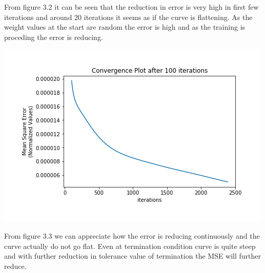 From figure 3.2 it can be seen that the reduction in error is very high in first few iterations and around 20 iterations it seems as if the curve is flattening. As the weight values at the start are random the error is high and as the training is proceding the error is reducing.
\begin{center}
	\includegraphics[scale=0.8]{images/Convergence/Convergence_Plot2.png}
\end{center}
From figure 3.3 we can appreciate how the error is reducing continuously and the curve actually do not go flat. Even at termination condition curve is quite steep and with further reduction in tolerance value of termination the MSE will further reduce.

